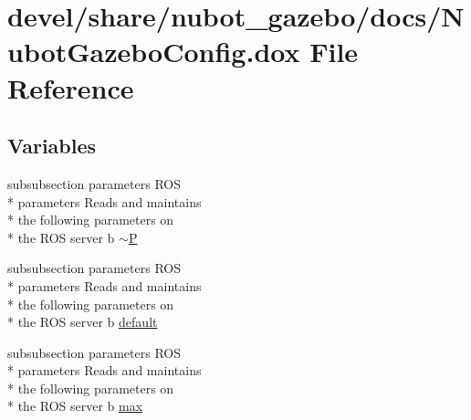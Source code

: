 \hypertarget{NubotGazeboConfig_8dox}{\section{devel/share/nubot\-\_\-gazebo/docs/\-Nubot\-Gazebo\-Config.dox File Reference}
\label{NubotGazeboConfig_8dox}
}
\subsection*{Variables}
\begin{DoxyCompactItemize}
\item 
subsubsection parameters R\-O\-S \\*
parameters Reads and maintains \\*
the following parameters on \\*
the R\-O\-S server b \hyperlink{NubotGazeboConfig_8dox_a0877f4459572b3f982a7df3e47017639}{$\sim$\-P}
\item 
subsubsection parameters R\-O\-S \\*
parameters Reads and maintains \\*
the following parameters on \\*
the R\-O\-S server b \hyperlink{NubotGazeboConfig_8dox_a94d02332ecf13e7845f06fe8c343e101}{default}
\item 
subsubsection parameters R\-O\-S \\*
parameters Reads and maintains \\*
the following parameters on \\*
the R\-O\-S server b \hyperlink{NubotGazeboConfig_8dox_a55c9de72d9f3630abdf51bfe39c191dd}{max}
\end{DoxyCompactItemize}


